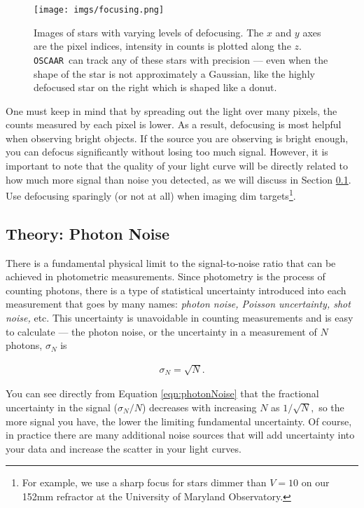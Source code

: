 \documentclass[a4paper]{article}
\newcommand{\code}[1]{\texttt{#1}}
\newcommand{\oscaar}{\code{OSCAAR}~}
\begin{document}
\begin{figure}[H]
\begin{center}
\texttt{[image: imgs/focusing.png]}
\caption{Images of stars with varying levels of defocusing. The $x$ and $y$ axes are the pixel indices, intensity in counts is plotted along the $z$. \oscaar can track any of these stars with precision --- even when the shape of the star is not approximately a Gaussian, like the highly defocused star on the right which is shaped like a donut.}
\label{fig:defocus}
\end{center}
\end{figure}

One must keep in mind that by spreading out the light over many pixels, the counts measured by each pixel is lower. As a result, defocusing is most helpful when observing bright objects. If the source you are observing is bright enough, you can defocus significantly without losing too much signal. However, it is important to note that the quality of your light curve will be directly related to how much more signal than noise you detected, as we will discuss in Section \ref{sec:photonNoise}. Use defocusing sparingly (or not at all) when imaging dim targets\footnote{For example, we use a sharp focus for stars dimmer than $V=10$ on our 152mm refractor at the University of Maryland Observatory.}.

\subsection{Theory: Photon Noise} \label{sec:photonNoise}

There is a fundamental physical limit to the signal-to-noise ratio that can be achieved in photometric measurements. Since photometry is the process of counting photons, there is a type of statistical uncertainty introduced into each measurement that goes by many names: \textit{photon noise, Poisson uncertainty, shot noise,} etc. This uncertainty is unavoidable in counting measurements and is easy to calculate --- the photon noise, or the uncertainty in a measurement of $N$ photons, $\sigma_N$ is

\begin{eqnarray}
\sigma_N = \sqrt{N}. \label{eqn:photonNoise}
\end{eqnarray}

\noindent You can see directly from Equation \ref{eqn:photonNoise} that the fractional uncertainty in the signal ($\sigma_N/N$) decreases with increasing $N$ as $1/\sqrt{N},$
so the more signal you have, the lower the limiting fundamental uncertainty. Of course, in practice there are many additional noise sources that will add uncertainty into your data and increase the scatter in your light curves. 
 
\end{document}
